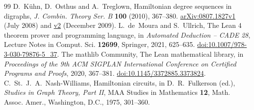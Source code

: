 \documentclass[11pt]{article}
\begin{document}
\begin{thebibliography}{99}
 D.~Kühn, D.~Osthus and A.~Treglown, Hamiltonian degree sequences in digraphs, \emph{J. Combin. Theory Ser. B} \textbf{100} (2010), 367--380. \href{https://arxiv.org/abs/0807.1827v1}{arXiv:0807.1827v1} (July 2008) and \href{https://arxiv.org/abs/0807.1827v2}{v2} (December 2009).
 L.~de~Moura and S.~Ullrich, The Lean 4 theorem prover and programming language, in \emph{Automated Deduction -- CADE 28}, Lecture Notes in Comput. Sci. \textbf{12699}, Springer, 2021, 625--635. \href{https://doi.org/10.1007/978-3-030-79876-5_37}{doi:10.1007/978-3-030-79876-5\_37}.
 The mathlib Community, The Lean mathematical library, in \emph{Proceedings of the 9th ACM SIGPLAN International Conference on Certified Programs and Proofs}, 2020, 367--381. \href{https://doi.org/10.1145/3372885.3373824}{doi:10.1145/3372885.3373824}.
 C.~St.~J.~A.~Nash-Williams, Hamiltonian circuits, in D.~R.~Fulkerson (ed.), \emph{Studies in Graph Theory, Part II}, MAA Studies in Mathematics \textbf{12}, Math. Assoc. Amer., Washington, D.C., 1975, 301--360.
\end{thebibliography}
\end{document}
